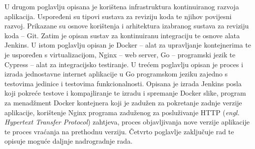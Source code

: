 U drugom poglavlju opisana je korištena infrastruktura kontinuiranog razvoja aplikacija. Uspoređeni
su tipovi sustava za reviziju koda te njihov povijesni razvoj. Prikazane su osnove korištenja i
arhitektura izabranog sustava za reviziju koda -- Git. Zatim je opisan sustav za kontinuiranu
integraciju te osnove alata Jenkins. U istom poglavlju opisan je Docker -- alat za upravljanje
kontejnerima te je uspoređen s virtualizacijom, Nginx -- web server, Go -- programski jezik te
Cypress -- alat za integracijsko testiranje. U trećem poglavlju opisan je proces i izrada
jednostavne internet aplikacije u Go programskom jeziku zajedno s testovima jedinice i testovima
funkcionalnosti. Opisana je izrada Jenkins posla koji pokreće testove i kompajliranje te izradu i
spremanje Docker slike, program za menadžment Docker kontejnera koji je zadužen za pokretanje zadnje
verzije aplikacije, korištenje Nginx programa zaduženog za posluživanje HTTP (\textit{engl.
Hypertext Transfer Protocol}) zahtjeva, proces objavljivanja nove verzije aplikacije te proces
vraćanja na prethodnu verziju. Četvrto poglavlje zaključuje rad te opisuje moguće daljnje
nadrogradnje rada.
